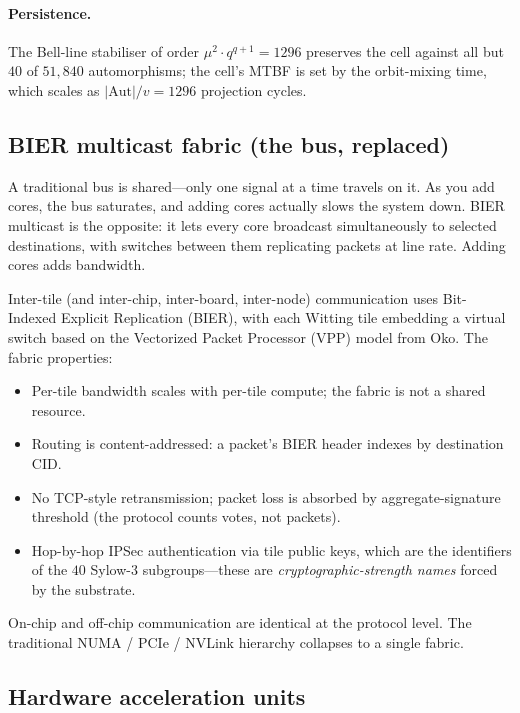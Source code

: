 \documentclass[11pt,letterpaper]{article}
\theoremstyle{remark}
\newcommand{\Aut}{\mathrm{Aut}}
\begin{document}
\paragraph{Persistence.} The Bell-line stabiliser of order $\mu^2 \cdot q^{q+1} = 1296$
preserves the cell against all but $40$ of $51{,}840$ automorphisms; the cell's MTBF is
set by the orbit-mixing time, which scales as $|\Aut|/v = 1296$ projection cycles.

\subsection{BIER multicast fabric (the bus, replaced)}

\begin{intuition}
A traditional bus is shared---only one signal at a time travels on it. As you add cores,
the bus saturates, and adding cores actually slows the system down. BIER multicast is
the opposite: it lets every core broadcast simultaneously to selected destinations, with
switches between them replicating packets at line rate. Adding cores adds bandwidth.
\end{intuition}

Inter-tile (and inter-chip, inter-board, inter-node) communication uses Bit-Indexed
Explicit Replication (BIER), with each Witting tile embedding a virtual switch based on
the Vectorized Packet Processor (VPP) model from Oko. The fabric properties:
\begin{itemize}[leftmargin=2em,nosep]
\item Per-tile bandwidth scales with per-tile compute; the fabric is not a shared
resource.
\item Routing is content-addressed: a packet's BIER header indexes by destination CID.
\item No TCP-style retransmission; packet loss is absorbed by aggregate-signature
threshold (the protocol counts votes, not packets).
\item Hop-by-hop IPSec authentication via tile public keys, which are the identifiers
of the $40$ Sylow-$3$ subgroups---these are \emph{cryptographic-strength names} forced by
the substrate.
\end{itemize}
On-chip and off-chip communication are identical at the protocol level. The traditional
NUMA / PCIe / NVLink hierarchy collapses to a single fabric.

\subsection{Hardware acceleration units}
\end{document}

